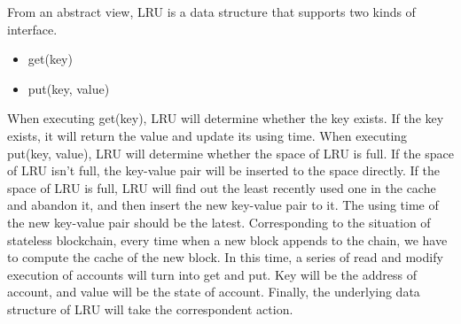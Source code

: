 \documentclass[conference]{IEEEtran}
\begin{document}
From an abstract view, LRU is a data structure that supports two kinds of interface.
\begin{itemize}
\item get(key)
\item put(key, value)
\end{itemize}
When executing get(key), LRU will determine whether the key exists. If the key exists, it will return the value and update its using time.
When executing put(key, value), LRU will determine whether the space of LRU is full. If the space of LRU isn’t full, the key-value pair will be inserted to the space directly.  If the space of LRU is full, LRU will find out the least recently used one in the cache and abandon it, and then insert the new key-value pair to it. The using time of the new key-value pair should be the latest.
Corresponding to the situation of stateless blockchain, every time when a new block appends to the chain, we have to compute the cache of the new block. In this time, a series of read and modify execution of accounts will turn into get and put. Key will be the address of account, and value will be the state of account. Finally, the underlying data structure of LRU will take the correspondent action.
\end{document}
